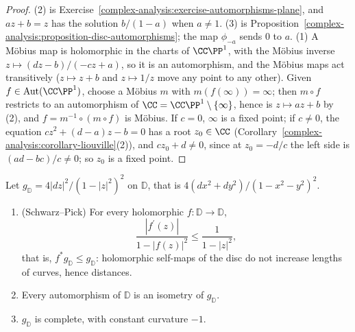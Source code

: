 \begin{proof}
(2) is Exercise~\ref{complex-analysis:exercise-automorphisms-plane}, and $az + b = z$ has the solution $b/(1 - a)$ when $a \neq 1$. (3) is
Proposition~\ref{complex-analysis:proposition-disc-automorphisms}; the map $\phi_{-a}$ sends $0$ to $a$. (1) A M\"obius map is holomorphic in the charts of $\CC\PP^1$, with the
M\"obius inverse $z \mapsto (dz - b)/(-cz + a)$, so it is an automorphism, and the M\"obius maps act transitively ($z \mapsto z + b$ and $z \mapsto 1/z$ move any point to any
other). Given $f \in \mathrm{Aut}(\CC\PP^1)$, choose a M\"obius $m$ with $m(f(\infty)) = \infty$; then $m \circ f$ restricts to an automorphism of $\CC = \CC\PP^1 \setminus \{\infty\}$,
hence is $z \mapsto az + b$ by (2), and $f = m^{-1} \circ (m \circ f)$ is M\"obius. If $c = 0$, $\infty$ is a fixed point; if $c \neq 0$, the equation $cz^2 + (d - a)z - b = 0$ has a
root $z_0 \in \CC$ (Corollary~\ref{complex-analysis:corollary-liouville}(2)), and $cz_0 + d \neq 0$, since at $z_0 = -d/c$ the left side is $(ad - bc)/c \neq 0$; so $z_0$ is a fixed point.
\end{proof}

\begin{proposition}\label{complex-manifolds:proposition-poincare-metric}
Let $g_{\mathbb{D}} = 4|dz|^2/(1 - |z|^2)^2$ on $\mathbb{D}$, that is $4(dx^2 + dy^2)/(1 - x^2 - y^2)^2$.
\begin{enumerate}
\item (Schwarz--Pick) For every holomorphic $f \colon \mathbb{D} \to \mathbb{D}$,
\[
\frac{|f^{\prime}(z)|}{1 - |f(z)|^2} \leq \frac1{1 - |z|^2},
\]
that is, $f^*g_{\mathbb{D}} \leq g_{\mathbb{D}}$: holomorphic self-maps of the disc do not increase lengths of curves, hence distances.
\item Every automorphism of $\mathbb{D}$ is an isometry of $g_{\mathbb{D}}$.
\item $g_{\mathbb{D}}$ is complete, with constant curvature $-1$.
\end{enumerate}
\end{proposition}

